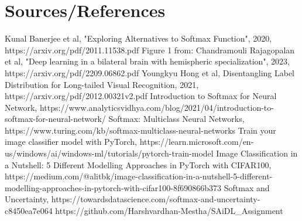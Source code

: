 \documentclass{article}
\begin{document}
\section{Sources/References}
Kunal Banerjee et al, "Exploring Alternatives to Softmax Function", 2020,  https://arxiv.org/pdf/2011.11538.pdf
\newline\newline
Figure 1 from: Chandramouli Rajagopalan et al, "Deep learning in a bilateral brain with hemispheric specialization", 2023, https://arxiv.org/pdf/2209.06862.pdf
\newline\newline
Youngkyu Hong et al, Disentangling Label Distribution for Long-tailed Visual Recognition, 2021, https://arxiv.org/pdf/2012.00321v2.pdf
\newline\newline
Introduction to Softmax for Neural Network, https://www.analyticsvidhya.com/blog/2021/04/introduction-to-softmax-for-neural-network/
\newline\newline
Softmax: Multiclass Neural Networks, https://www.turing.com/kb/softmax-multiclass-neural-networks
\newline\newline
Train your image classifier model with PyTorch, https://learn.microsoft.com/en-us/windows/ai/windows-ml/tutorials/pytorch-train-model
\newline\newline
Image Classification in a Nutshell: 5 Different Modelling Approaches in PyTorch with CIFAR100, https://medium.com/@alitbk/image-classification-in-a-nutshell-5-different-modelling-approaches-in-pytorch-with-cifar100-8f690866b373
\newline\newline
Softmax and Uncertainty, https://towardsdatascience.com/softmax-and-uncertainty-c8450ea7e064
\newline\newline
https://github.com/Harshvardhan-Mestha/SAiDL\_Assignment
\end{document}
